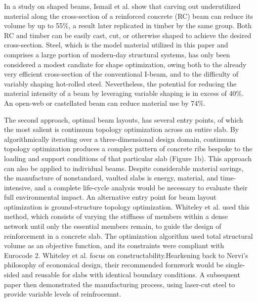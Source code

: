 \documentclass[10pt, letterpaper]{article} %
\begin{document}
    In a study on shaped beams, Ismail et al. show that carving out underutilized material along the cross-section of a reinforced concrete (RC) beam can reduce its volume by up to 55\%, a result later replicated in timber by the same group.\cite{ismailShapedBeamsUnlocking2021}\cite{mayencourtHybridAnalyticalComputational2020} Both RC and timber can be easily cast, cut, or otherwise shaped to achieve the desired cross-section. Steel, which is the model material utilized in this paper and comprises a large portion of modern-day structural systems, has only been considered a modest candiate for shape optimization, owing both to the already very efficient cross-section of the conventional I-beam, and to the difficulty of variably shaping hot-rolled steel.\cite{leeGeometryStrengthEfficiency2024} Nevertheless, the potential for reducing the material intensity of a beam by leveraging variable shaping is in excess of 40\%. An open-web or castellated beam can reduce material use by 74\%.\cite{carruthTechnicalPotentialReducing2011} 

    The second approach, optimal beam layouts, has several entry points, of which the most salient is continuum topology optimization across an entire slab.\cite{meibodiSmartSlabComputational2018} By algorithmically iterating over a three-dimensional design domain, continuum topology optimization produces a complex pattern of concrete ribs bespoke to the loading and support conditions of that particular slab (Figure 1b).\cite{rippmannDesignFabricationTesting2018} This approach can also be applied to individual beams. \cite{jewettTopologyoptimizedDesignConstruction2019} Despite considerable material savings, the manufacture of nonstandard, vaulted slabs is energy, material, and time-intensive, and a complete life-cycle analysis would be necessary to evaluate their full environmental impact.\cite{liEnergyRequirementsEvaluation2013} An alternative entry point for beam layout optimization is ground-structure topology optimization. Whiteley et al. used this method, which consists of varying the stiffness of members within a dense network until only the essential members remain, to guide the design of reinforcement in a concrete slab.\cite{whiteleyEngineeringDesignOptimized2023} The optimization algorithm used total structural volume as an objective function, and its constraints were compliant with Eurocode 2. Whiteley et al. focus on constructability.Hearkening back to Nervi’s philosophy of economical design, their recommended formwork would be single-sided and reusable for slabs with identical boundary conditions. A subsequent paper then demonstrated the manufacturing process, using laser-cut steel to provide variable levels of reinfrocemnt.\cite{bradburyApplicationsOptimalReinforcement2024} 
\end{document}
